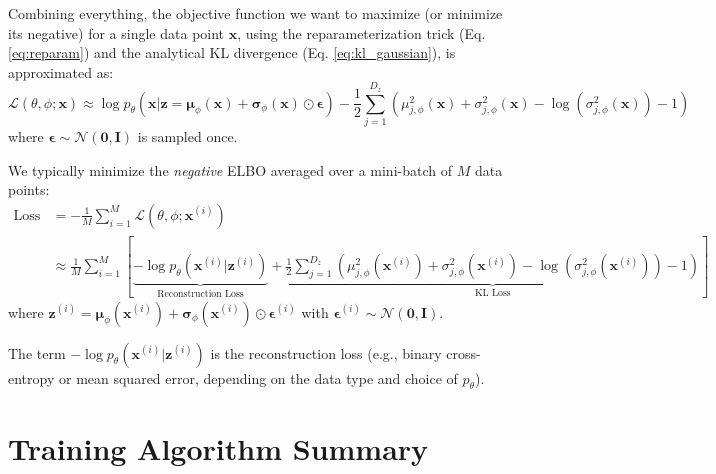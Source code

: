\documentclass[11pt, letterpaper]{article}
\newcommand{\vx}{\boldsymbol{x}} %
\newcommand{\vz}{\boldsymbol{z}} %
\newcommand{\vepsilon}{\boldsymbol{\epsilon}} %
\newcommand{\vmu}{\boldsymbol{\mu}} %
\newcommand{\vsigma}{\boldsymbol{\sigma}} %
\newcommand{\mI}{\boldsymbol{I}} %
\newcommand{\Ndist}{\mathcal{N}} %
\begin{document}
Combining everything, the objective function we want to maximize (or minimize its negative) for a single data point $\vx$, using the reparameterization trick (Eq. \ref{eq:reparam}) and the analytical KL divergence (Eq. \ref{eq:kl_gaussian}), is approximated as:
\begin{equation}
    \mathcal{L}(\theta, \phi; \vx) \approx \log p_{\theta}(\vx|\vz = \vmu_{\phi}(\vx) + \vsigma_{\phi}(\vx) \odot \vepsilon) - \frac{1}{2} \sum_{j=1}^{D_z} \left( \mu_{j, \phi}^2(\vx) + \sigma_{j, \phi}^2(\vx) - \log(\sigma_{j, \phi}^2(\vx)) - 1 \right)
    \label{eq:final_elbo_approx}
\end{equation}
where $\vepsilon \sim \Ndist(\mathbf{0}, \mI)$ is sampled once.

We typically minimize the \emph{negative} ELBO averaged over a mini-batch of $M$ data points:
\begin{align}
    \text{Loss} &= -\frac{1}{M} \sum_{i=1}^M \mathcal{L}(\theta, \phi; \vx^{(i)}) \\
    &\approx \frac{1}{M} \sum_{i=1}^M \left[ \underbrace{-\log p_{\theta}(\vx^{(i)}|\vz^{(i)})}_{\text{Reconstruction Loss}} + \underbrace{\frac{1}{2} \sum_{j=1}^{D_z} \left( \mu_{j, \phi}^2(\vx^{(i)}) + \sigma_{j, \phi}^2(\vx^{(i)}) - \log(\sigma_{j, \phi}^2(\vx^{(i)})) - 1 \right)}_{\text{KL Loss}} \right]
    \label{eq:final_loss}
\end{align}
where $\vz^{(i)} = \vmu_{\phi}(\vx^{(i)}) + \vsigma_{\phi}(\vx^{(i)}) \odot \vepsilon^{(i)}$ with $\vepsilon^{(i)} \sim \Ndist(\mathbf{0}, \mI)$.

The term $-\log p_{\theta}(\vx^{(i)}|\vz^{(i)})$ is the reconstruction loss (e.g., binary cross-entropy or mean squared error, depending on the data type and choice of $p_{\theta}$).

\section{Training Algorithm Summary}
\end{document}
